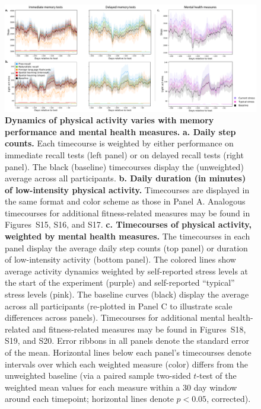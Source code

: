 \documentclass[10pt]{article}
\newcommand{\activityTimecourse}{S15}
\newcommand{\cardioTimecourse}{S16}
\newcommand{\sleepTimecourse}{S17}
\newcommand{\activityTimecourseMH}{S18}
\newcommand{\cardioTimecourseMH}{S19}
\newcommand{\sleepTimecourseMH}{S20}
\begin{document}
\begin{figure}[tp]
\centering
\includegraphics[width=\textwidth]{figs/weighted_timecourse_summary}
\caption{\textbf{Dynamics of physical activity varies with memory
    performance and mental health measures.}  \textbf{a. Daily step counts.}  Each
  timecourse is weighted by either performance on immediate recall tests
  (left panel) or on delayed recall tests (right panel).  The black
  (baseline) timecourses display the (unweighted) average across all
  participants.  \textbf{b. Daily duration (in minutes) of low-intensity physical
    activity.}  Timecourses are displayed in the same format and color
scheme as those in Panel A.  Analogous timecourses for additional
fitness-related measures may be found in Figures~\activityTimecourse,
\cardioTimecourse, and \sleepTimecourse.  \textbf{c. Timecourses of physical
  activity, weighted by mental health measures.}  The timecourses in
each panel display the average daily step counts (top panel) or
duration of low-intensity activity (bottom panel).  The colored lines
show average activity dynamics weighted by self-reported stress levels
at the start of the experiment (purple) and self-reported ``typical''
stress levels (pink).  The baseline curves (black) display the
average across all participants (re-plotted in Panel C to illustrate
scale differences across panels).  Timecourses for additional mental
health-related and fitness-related measures may be found in
Figures~\activityTimecourseMH, \cardioTimecourseMH, and \sleepTimecourseMH. Error ribbons in all panels denote
the standard error of the mean.  Horizontal lines below each panel's
timecourses denote intervals over which each weighted measure (color) differs
from the unweighted baseline (via a paired sample two-sided $t$-test
of the weighted mean values for each measure within a 30 day window around each timepoint; horizontal lines denote $p <
0.05$, corrected).}
\label{fig:dynamics}
\end{figure}
\end{document}
